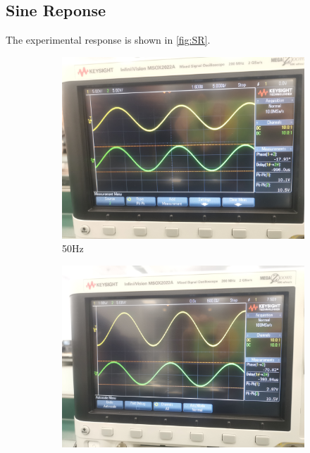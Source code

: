 \documentclass[a4paper]{article}
\begin{document}
    \subsection{Sine Reponse}
    The experimental response is shown in \autoref{fig:SR}.
    \begin{figure}[h]
        \centering
        \begin{subfigure}{0.32\textwidth}
            \includegraphics[width=\textwidth, trim={0 1cm 7cm 1cm}, clip]{50.jpg}
            \caption{50Hz}
        \end{subfigure}
        \begin{subfigure}{0.326\textwidth}
            \includegraphics[width=\textwidth, trim={0 1cm 7cm 1cm}, clip]{500.jpg}

\end{subfigure}
\end{figure}
\end{document}
